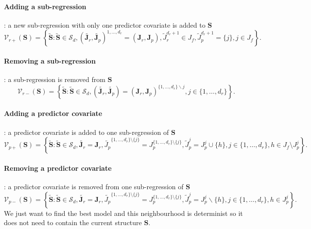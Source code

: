 \documentclass[12pt,a4paper]{report}
\begin{document}
	\paragraph{Adding a sub-regression}: a new sub-regression with only one predictor covariate is added to $\boldsymbol{S}$
\begin{equation}
\mathcal{V}_{r+}(\boldsymbol{S}) = \left\{\tilde{\boldsymbol{S}}: \tilde{\boldsymbol{S}}\in\mathcal{S}_d, (\tilde{\boldsymbol{J}_r},\tilde{\boldsymbol{J}_p})^{1,\ldots,d_r}=(\boldsymbol{J}_r,\boldsymbol{J}_p), \tilde{J}_r^{d_r+1}\in J_f, \tilde{J}_p^{d_r+1}=\{j\}, j\in J_f \right\}.
\end{equation}	
		\paragraph{Removing a sub-regression}: a sub-regression  is removed from $\boldsymbol{S}$
\begin{equation}
\mathcal{V}_{r-}(\boldsymbol{S}) = \left\{\tilde{\boldsymbol{S}}: \tilde{\boldsymbol{S}}\in\mathcal{S}_d, (\tilde{\boldsymbol{J}_r},\tilde{\boldsymbol{J}_p})=(\boldsymbol{J}_r,\boldsymbol{J}_p)^{\{1,\ldots,d_r\}\backslash j}, j\in\{1,\ldots,d_r\} \right\}.
\end{equation}	
	\paragraph{Adding a predictor covariate}: a predictor covariate is added to one sub-regression of $\boldsymbol{S}$
\begin{equation}
\mathcal{V}_{p+}(\boldsymbol{S}) = \left\{\tilde{\boldsymbol{S}}: \tilde{\boldsymbol{S}}\in\mathcal{S}_d, \tilde{\boldsymbol{J}_r}=\boldsymbol{J}_r, \tilde{J_p}^{\{1,\dots,d_r \}\setminus \{j\}}=J_p^{\{1,\dots,d_r \}\setminus \{j\}} ,\tilde{J}_p^{j}=J_p^{j} \cup \{h\}, j\in \{1,\ldots,d_r\}, h\in J_f \setminus J_p^j\right\}.
\end{equation}
	\paragraph{Removing a predictor covariate}: a predictor covariate is removed from one sub-regression of $\boldsymbol{S}$
\begin{equation}
\mathcal{V}_{p-}(\boldsymbol{S}) = \left\{\tilde{\boldsymbol{S}}: \tilde{\boldsymbol{S}}\in\mathcal{S}_d, \tilde{\boldsymbol{J}_r}=\boldsymbol{J}_r,\tilde{J_p}^{\{1,\dots,d_r \}\setminus \{j\}}=J_p^{\{1,\dots,d_r \}\setminus \{j\}} , \tilde{J}_p^{j}=J_p^{j} \backslash \{h\}, j\in \{1,\ldots,d_r\}, h\in  J_p^j \right\}.
\end{equation}	
	We just want to find the best model and this neighbourhood is determinist so it does not need to contain the current structure $\boldsymbol{S}$.
	
\end{document}

